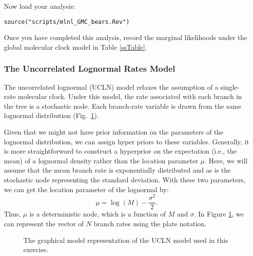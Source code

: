 Now load your \RevBayes analysis:

{\tt \begin{snugshade*}
\begin{lstlisting}
source("scripts/mlnl_GMC_bears.Rev")
\end{lstlisting}
\end{snugshade*}}

{\begin{framed}
Once you have completed this analysis, record the marginal likelihoods under the global molecular clock model in Table \ref{ssTable}.
\end{framed}}

\bigskip
\subsubsection{The Uncorrelated Lognormal Rates Model}\label{UCLNModelSec}

The uncorrelated lognormal (UCLN) model relaxes the assumption of a single-rate molecular clock. 
Under this model, the rate associated with each branch in the tree is a stochastic node.
Each branch-rate variable is drawn from the same lognormal distribution (Fig.~\ref{m_UCLN:fig}).

Given that we might not have prior information on the parameters of the lognormal distribution, we can assign hyper priors to these variables. 
Generally, it is more straightforward to construct a hyperprior on the expectation (i.e., the mean) of a lognormal density rather than the location parameter $\mu$. 
Here, we will assume that the mean branch rate is exponentially distributed and as is the stochastic node representing the standard deviation.
With these two parameters, we can get the location parameter of the lognormal by:
$$\mu = \log(M) - \frac{\sigma^2}{2}.$$
Thus, $\mu$ is a deterministic node, which is a function of $M$ and $\sigma$.
In Figure \ref{m_UCLN:fig}, we can represent the vector of $N$ branch rates using the plate notation. %
\begin{figure}[h!]
\centering
{}
\caption{\small The graphical model representation of the UCLN model used in this exercise.}
\label{m_UCLN:fig}
\end{figure}


%
%
%

